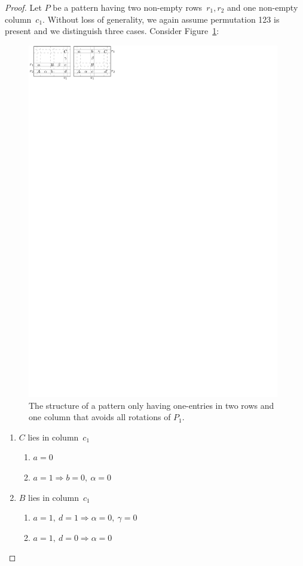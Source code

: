 \begin{proof}
Let $P$ be a pattern having two non-empty rows~$r_1,r_2$ and one non-empty column~$c_1$. Without loss of generality, we again assume permutation 123 is present and we distinguish three cases. Consider Figure~\ref{fig:twoplusone}:
\begin{figure}[!ht]
	\centering
	\includegraphics[width=110mm]{img/twoplusone.pdf}
	\caption{The structure of a pattern only having one-entries in two rows and one column that avoids all rotations of $P_1$.}
	\label{fig:twoplusone}
\end{figure}
\begin{enumerate}
\item $C$ lies in column~$c_1$
	\begin{enumerate}
		\item $a=0$
		\item $a=1\Rightarrow b=0,\ \alpha=0$
	\end{enumerate}
\item $B$ lies in column~$c_1$
	\begin{enumerate}
		\item $a=1,\ d=1\Rightarrow\alpha=0,\ \gamma=0$
		\item $a=1,\ d=0\Rightarrow\alpha=0$

\end{enumerate}
\end{enumerate}
\end{proof}
